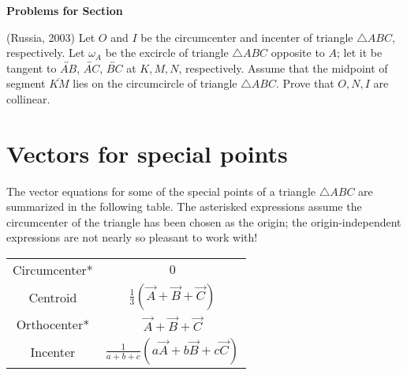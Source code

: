 \documentclass[12pt]{book}
\newcounter{exc}
\numberwithin{exc}{section}
\numberwithin{figure}{section}
\newenvironment{exer}{\vspace{0.1in}
\noindent \textbf{Problems for Section~\thesection} \vspace{0.1in}
\begin{list}{\arabic{exc}.}{\usecounter{exc}}}{\end{list}}
\numberwithin{equation}{theorem}
\def\ii{\item}
\def\vA{\vec{A}}
\def\vB{\vec{B}}
\def\vC{\vec{C}}
\def\line#1{\overleftrightarrow{#1}}
\def\seg#1{\overline{#1}}
\begin{document}
\begin{exer}
\ii \label{ex:rus2003frame}
(Russia, 2003)
Let $O$ and $I$ be the circumcenter and incenter of triangle $\triangle ABC$,
respectively. Let $\omega_A$ be the excircle of triangle $\triangle ABC$ 
opposite
to $A$; let it be tangent to $\line{AB}$, $\line{AC}$, $\line{BC}$ 
at $K,M,N$, respectively.
Assume that the midpoint of segment $\seg{KM}$ lies on the circumcircle
of triangle $\triangle ABC$. Prove that $O,N,I$ are collinear.
\end{exer}

\section{Vectors for special points}

The vector equations for some of the special points of a triangle 
$\triangle ABC$ are 
summarized in the following table. The asterisked expressions assume the 
circumcenter of the triangle has been chosen as the origin; the 
origin-independent expressions are not nearly so pleasant to work with!

\begin{center}
\begin{tabular}{cc}
Circumcenter* & $0$ \\
Centroid & $\frac{1}{3} (\vA + \vB + \vC)$ \\
Orthocenter* & $\vA + \vB + \vC$ \\
Incenter & $\frac{1}{a+b+c} (a\vA + b\vB + c\vC)$
\end{tabular}
\end{center}
\end{document}
